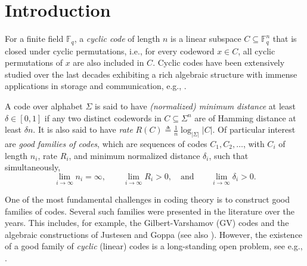 \documentclass[twocolumn,twoside]{IEEEtran}
\theoremstyle{plain}
\newcommand{\abs}[1]{\left|#1\right|}
\renewcommand{\Bbb}{\mathbb}
\renewcommand{\Bbb}{\mathbb}
\newcommand{\Fq}{{{\Bbb F}}_{\!q}}
\newcommand{\eqdef}{\triangleq}
\begin{document}

\section{Introduction}
\label{sec:intro}

For a finite field $\Fq$, a \emph{cyclic code} of length $n$ is a
linear subspace $C\subseteq\Fq^n$ that is closed under cyclic
permutations, i.e., for every codeword $x \in C$, all cyclic
permutations of $x$ are also included in $C$. Cyclic codes have been
extensively studied over the last decades exhibiting a rich algebraic
structure with immense applications in storage and communication,
e.g.,
\cite{chien1964cyclic,forney1965decoding,massey1969shift,macwilliams1977theory}.

A code over alphabet $\Sigma$ is said to have \emph{(normalized) minimum distance} at least
$\delta \in [0,1]$ if any two distinct codewords in $C \subseteq \Sigma^n$ are of Hamming
distance at least $\delta n$. It is also said to have \emph{rate}
$R(C) \eqdef \frac{1}{n}\log_{|\Sigma|}\abs{C}$. Of particular interest are
\emph{good families of codes}, which are sequences of codes
$C_1,C_2,\dots$, with $C_i$ of length $n_i$, rate $R_i$, and minimum
normalized distance $\delta_i$, such that simultaneously,
\[ \lim_{i\to\infty}n_i=\infty, \qquad \lim_{i\to\infty}R_i >0,\mbox{~~~and} \qquad \lim_{i\to\infty}\delta_i > 0.\]

One of the most fundamental challenges in coding theory is to construct good families of codes.
Several such families were presented in the literature over the years. This includes, for example,
the Gilbert-Varshamov (GV) codes \cite{gilbert1952comparison,gilbert1957comparison} and the 
algebraic constructions of Justesen \cite{Justesen} and Goppa \cite{Goppa} (see also \cite{macwilliams1977theory}).
However, the existence of a good family
of \emph{cyclic} (linear) codes is a long-standing open problem, see e.g.,
\cite{martinez2006class,bazzi2006some,ding2014binary,dougherty2015open}.
\end{document}
